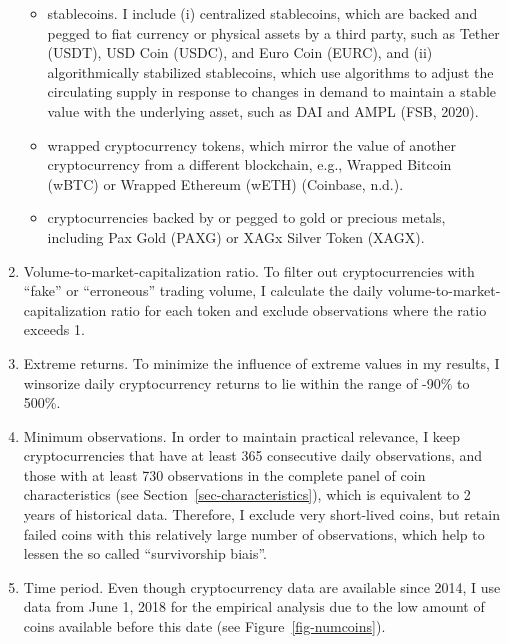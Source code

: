 \documentclass[
  11pt,
  a4paper,
  openany]{scrreprt}
\begin{document}
\begin{enumerate}
  \begin{itemize}
  \item
    stablecoins. I include (i) centralized stablecoins, which are backed
    and pegged to fiat currency or physical assets by a third party,
    such as Tether (USDT), USD Coin (USDC), and Euro Coin (EURC), and
    (ii) algorithmically stabilized stablecoins, which use algorithms to
    adjust the circulating supply in response to changes in demand to
    maintain a stable value with the underlying asset, such as DAI and
    AMPL (FSB, 2020).
  \item
    wrapped cryptocurrency tokens, which mirror the value of another
    cryptocurrency from a different blockchain, e.g., Wrapped Bitcoin
    (wBTC) or Wrapped Ethereum (wETH) (Coinbase, n.d.).
  \item
    cryptocurrencies backed by or pegged to gold or precious metals,
    including Pax Gold (PAXG) or XAGx Silver Token (XAGX).
  \end{itemize}
\item
  Volume-to-market-capitalization ratio. To filter out cryptocurrencies
  with ``fake'' or ``erroneous'' trading volume, I calculate the daily
  volume-to-market-capitalization ratio for each token and exclude
  observations where the ratio exceeds 1.
\item
  Extreme returns. To minimize the influence of extreme values in my
  results, I winsorize daily cryptocurrency returns to lie within the
  range of -90\% to 500\%.
\item
  Minimum observations. In order to maintain practical relevance, I keep
  cryptocurrencies that have at least 365 consecutive daily
  observations, and those with at least 730 observations in the complete
  panel of coin characteristics (see Section~\ref{sec-characteristics}),
  which is equivalent to 2 years of historical data. Therefore, I
  exclude very short-lived coins, but retain failed coins with this
  relatively large number of observations, which help to lessen the so
  called ``survivorship biais''.
\item
  Time period. Even though cryptocurrency data are available since 2014,
  I use data from June 1, 2018 for the empirical analysis due to the low
  amount of coins available before this date (see
  Figure~\ref{fig-numcoins}).
\end{enumerate}
\end{document}
